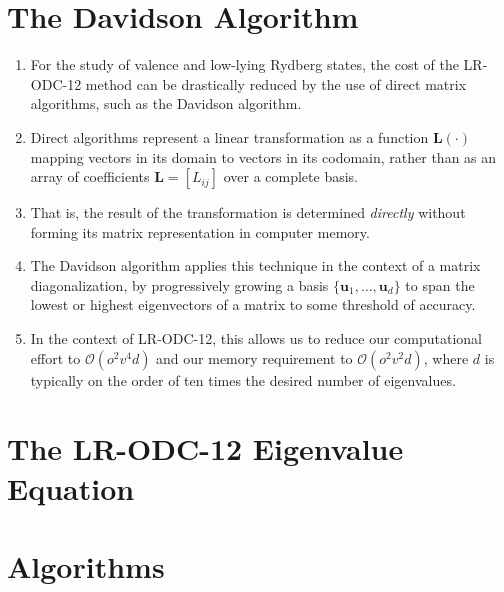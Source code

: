 \section{The Davidson Algorithm}
\begin{enumerate}
    \item
        For the study of valence and low-lying Rydberg states, the cost of the
        LR-ODC-12 method can be drastically reduced by the use of direct matrix
        algorithms, such as the Davidson
        algorithm.\cite{Liu:1978p49,Davidson:1975p87}
    \item
        Direct algorithms represent a linear transformation as a function
        \(
            \mathbf{L}(\cdot)
        \)
        mapping vectors in its domain to vectors in its codomain, rather than as
        an array of coefficients
        \(
            \mathbf{L}
            =
            [L_{ij}]
        \)
        over a complete basis.
    \item
        That is, the result of the transformation is determined {\itshape
        directly} without forming its matrix representation in computer memory.
    \item
        The Davidson algorithm applies this technique in the context of a matrix
        diagonalization, by progressively growing a basis
        \(
            \{\mathbf{u}_1, \ldots,\mathbf{u}_d\}
        \)
        to span the lowest or highest eigenvectors of a matrix to some threshold
        of accuracy.
    \item
        In the context of LR-ODC-12, this allows us to reduce our computational
        effort to \(\mathcal{O}(o^2v^4d)\) and our memory requirement to
        \(\mathcal{O}(o^2v^2d)\), where \(d\) is typically on the order of ten
        times the desired number of eigenvalues.
\end{enumerate}


\section{The LR-ODC-12 Eigenvalue Equation}


\section{Algorithms}
\label{sec:algorithms}

